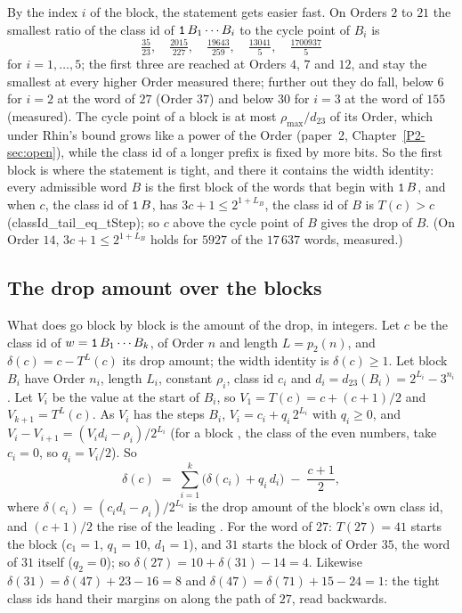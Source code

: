 \documentclass[10pt,a4paper,titlepage]{article}
\newcommand{\lean}[1]{\textsf{#1}}
\begin{document}
By the index $i$ of the block, the statement gets easier fast. On Orders $2$ to $21$ the
smallest ratio of the class id of $\text{\texttt{1}}\,B_1 \cdots B_i$ to the cycle point of $B_i$ is
\[
\tfrac{35}{23}, \quad \tfrac{2015}{227}, \quad
\tfrac{19643}{259}, \quad \tfrac{13041}{5}, \quad
\tfrac{1700937}{5}
\]
for $i = 1, \ldots, 5$; the first three are reached at Orders $4$, $7$ and $12$, and stay the
smallest at every higher Order measured there; further out they do fall, below $6$ for $i = 2$ at the word
of $27$ (Order $37$) and below $30$ for $i = 3$ at the word of $155$ (measured). The cycle point of a block is at most $\rho_{\max}/d_{23}$ of its
Order, which under Rhin's bound grows like a power of the Order (paper~2, Chapter~\ref{P2-sec:open}), while the class id of a longer prefix is fixed
by more bits. So the first block is where the statement is tight, and there it contains
the width identity: every admissible word $B$ is the first block of the words that begin with $\text{\texttt{1}}\,B$, and when
$c$, the class id of $\text{\texttt{1}}\,B$, has $3c + 1 \le 2^{1 + L_B}$, the class id of $B$ is
$T(c) > c$ (\lean{classId\_tail\_eq\_tStep}); so $c$ above the cycle point of $B$ gives the
drop of $B$. (On Order $14$, $3c + 1 \le 2^{1 + L_B}$ holds for $5927$ of the $17\,637$ words, measured.)

\subsection*{The drop amount over the blocks}

What does go block by block is the amount of the drop, in integers. Let $c$ be the class id
of $w = \text{\texttt{1}}\,B_1 \cdots B_k$, of Order $n$ and length $L = p_2(n)$, and $\delta(c) = c - T^{L}(c)$
its drop amount; the width identity is $\delta(c) \ge 1$. Let block $B_i$ have Order $n_i$, length
$L_i$, constant $\rho_i$, class id $c_i$ and $d_i = d_{23}(B_i) = 2^{L_i} - 3^{n_i}$. Let $V_i$ be the
value at the start of $B_i$, so $V_1 = T(c) = c + (c+1)/2$ and $V_{k+1} = T^L(c)$. As $V_i$ has the
steps $B_i$, $V_i = c_i + q_i\,2^{L_i}$ with $q_i \ge 0$, and $V_i - V_{i+1} = (V_i d_i - \rho_i)/2^{L_i}$
(for a block , the class of the even numbers, take $c_i = 0$, so $q_i = V_i/2$). So
\[
\delta(c) \;=\; \sum_{i=1}^{k} \bigl(\delta(c_i) + q_i\,d_i\bigr) \;-\; \frac{c+1}{2},
\]
where $\delta(c_i) = (c_i d_i - \rho_i)/2^{L_i}$ is the drop amount of the block's own class id,
and $(c+1)/2$ the rise of the leading . For the word of $27$: $T(27) = 41$ starts the
block  ($c_1 = 1$, $q_1 = 10$, $d_1 = 1$), and $31$ starts the block of Order $35$, the
word of $31$ itself ($q_2 = 0$); so $\delta(27) = 10 + \delta(31) - 14 = 4$. Likewise $\delta(31) = \delta(47) +
23 - 16 = 8$ and $\delta(47) = \delta(71) + 15 - 24 = 1$: the tight class ids hand their margins on
along the path of $27$, read backwards.
\end{document}
